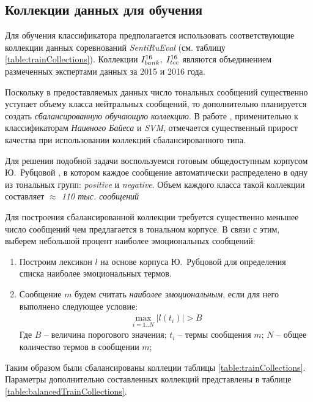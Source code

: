 \subsection{Коллекции данных для обучения}
    Для обучения классификатора предполагается использовать соответствующие
    коллекции данных соревнований {\it SentiRuEval} (см. таблицу
    \ref{table:trainCollections}).
    Коллекции $I_{bank}^{16}, \hspace{0.1cm} I_{tcc}^{16}$ являются объединением
    размеченных экспертами данных за 2015 и 2016 года.

    

    Поскольку в предоставляемых
    данных число тональных сообщений существенно уступает объему класса
    нейтральных сообщений, то дополнительно планируется создать {\it сбалансированную
    обучающую коллекцию}.
    В работе \cite{diploma2015}, применительно к классификаторам {\it
    Наивного Байеса} и {\it SVM}, отмечается существенный прирост качества при
    использовании коллекций сбалансированного типа.

    Для решения подобной задачи воспользуемся готовым общедоступным корпусом Ю.~Рубцовой
    \cite{rubtsovaCollection}, в
    котором каждое сообщение автоматически распределено в одну из тональных групп:
    {\it positive} и {\it negative}.
    Объем каждого класса такой коллекции составляет {\it $\approx$ 110 тыс.
    сообщений}

    Для построения сбалансированной коллекции требуется существенно меньшее
    число сообщений чем предлагается в тональном корпусе.
    В связи с этим, выберем небольшой процент наиболее эмоциональных сообщений:
    \begin{enumerate}
        \item Построим лексикон $l$ на основе корпуса Ю.~Рубцовой для определения
            списка наиболее эмоциональных термов.
        \item Сообщение $m$ будем считать {\it наиболее эмоциональным},
            если для него выполнено следующее условие:
            \begin{gather}
                \max\limits_{i=1..N} |l(t_i)| > B
            \end{gather}
            Где $B$ -- величина порогового значения; \hspace{0.5pt}
            $t_i$ -- термы сообщения $m$; \hspace{0.5pt}
            $N$ -- общее количество термов в сообщении $m$;
    \end{enumerate}

    Таким образом были сбалансированы коллеции таблицы \ref{table:trainCollections}.
    Параметры дополнительно составленных коллекций представлены
    в таблице \ref{table:balancedTrainCollections}.

    
